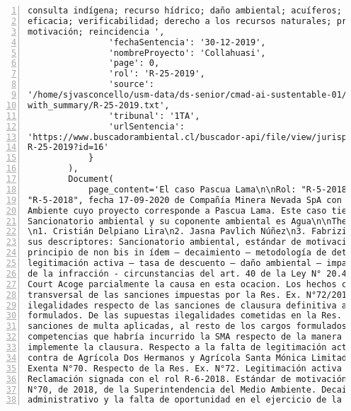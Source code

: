 \begin{Verbatim}[frame=lines, label=Elavoración propia -  Ejemplo de Contexto enviado por el Chatbot a OpenAI
				, fontsize=\scriptsize, numbers=left
				, baselinestretch=0.4
				, formatcom=\color{gray}]
consulta indígena; recurso hídrico; daño ambiental; acuíferos; criterios; integridad;
eficacia; verificabilidad; derecho a los recursos naturales; principio de participación;
motivación; reincidencia ',
                'fechaSentencia': '30-12-2019',
                'nombreProyecto': 'Collahuasi',
                'page': 0,
                'rol': 'R-25-2019',
                'source':
'/home/sjvasconcello/usm-data/ds-senior/cmad-ai-sustentable-01/etl/load/../../data/clean/docs_
with_summary/R-25-2019.txt',
                'tribunal': '1TA',
                'urlSentencia':
'https://www.buscadorambiental.cl/buscador-api/file/view/jurisprudencia/S1TA Rol N°
R-25-2019?id=16'
            }
        ),
        Document(
            page_content='El caso Pascua Lama\n\nRol: "R-5-2018", Rol: "R-5-2018",Rol:
"R-5-2018", fecha 17-09-2020 de Compañía Minera Nevada SpA con Superintendencia del Medio
Ambiente cuyo proyecto corresponde a Pascua Lama. Este caso tiene como principal materia
Sancionatorio ambiental y su coponente ambiental es Agua\n\nThe integration ministers are:
\n1. Cristián Delpiano Lira\n2. Jasna Pavlich Núñez\n3. Fabrizio Queirolo Pellerano\n\nSiendo
sus descriptores: Sancionatorio ambiental, estándar de motivación – proporcionalidad –
principio de non bis in ídem – decaimiento – metodología de determinación de sanciones –
legitimación activa – tasa de descuento – daño ambiental – impacto ambiental – clasificación
de la infracción - circunstancias del art. 40 de la Ley N° 20.417\n\nEl First Environmental
Court Acoge parcialmente la causa en esta ocacion. Los hechos controvertidos son: Ilegalidad
transversal de las sanciones impuestas por la Res. Ex. N°72/2018. De las supuestas
ilegalidades respecto de las sanciones de clausura definitiva aplicadas a cinco de los cargos
formulados. De las supuestas ilegalidades cometidas en la Res. Ex. N°72/2018, respecto de las
sanciones de multa aplicadas, al resto de los cargos formulados. Del supuesto exceso en las
competencias que habría incurrido la SMA respecto de la manera en que pretende que se
implemente la clausura. Respecto a la falta de legitimación activa alegada por la SMA en
contra de Agrícola Dos Hermanos y Agrícola Santa Mónica Limitada. Respecto de la Resolución
Exenta N°70. Respecto de la Res. Ex. N°72. Legitimación activa de los reclamantes de la
Reclamación signada con el rol R-6-2018. Estándar de motivación exigido. Resolución Exenta
N°70, de 2018, de la Superintendencia del Medio Ambiente. Decaimiento del procedimiento
administrativo y la falta de oportunidad en el ejercicio de la potestad sancionatorio. De la

\end{Verbatim}
